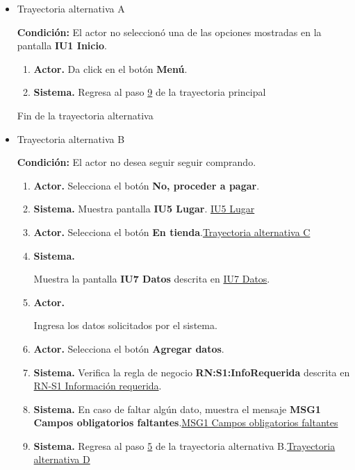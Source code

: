 	\begin{itemize}

		\item \hypertarget{CU1:TAA}{Trayectoria alternativa A}

			\noindent \textbf{Condición:} El actor no seleccionó una de las opciones mostradas en la pantalla \textbf{IU1 Inicio}.
			
			\begin{enumerate}
				\item \textbf{Actor.} Da click en el botón \textbf{Menú}.
				\item \textbf{Sistema.} Regresa al paso \hyperlink{CU1:TP:P9}{9} de la trayectoria principal
			\end{enumerate}
			
			Fin de la trayectoria alternativa
			
		\item \hypertarget{CU1:TAB}{Trayectoria alternativa B}
			
			\noindent \textbf{Condición:} El actor no desea seguir seguir comprando.
			
			\begin{enumerate}
				\item \textbf{Actor.} Selecciona el botón \textbf{No, proceder a pagar}. 
				\item \textbf{Sistema.} Muestra pantalla \textbf{IU5 Lugar}. \hyperlink{IU5}{IU5 Lugar}
				\item \textbf{Actor.} Selecciona el botón \textbf{En tienda}.\hyperlink{CU1:TAC}{Trayectoria alternativa C}
				\item \hypertarget{CU1:TAB:P4} {\textbf{Sistema.}} Muestra la pantalla \textbf{IU7 Datos} descrita en \hyperlink{IU7}{IU7 Datos}.
				\item \hypertarget{CU1:TAB:P5}{\textbf{Actor.}} Ingresa los datos solicitados por el sistema.
				\item \textbf{Actor.} Selecciona el botón \textbf{Agregar datos}.
				\item \textbf{Sistema.} Verifica la regla de negocio \textbf{RN:S1:InfoRequerida} descrita en \hyperlink{RN:S1:InfoRequerida}{RN-S1 Información requerida}.
				\item \textbf{Sistema.} En caso de faltar algún dato, muestra el mensaje \textbf{MSG1 Campos obligatorios faltantes}.\hyperlink{MSG1:CamposObligatorios}{MSG1 Campos obligatorios faltantes}
				\item \textbf{Sistema.} Regresa al paso \hyperlink{CU1:TAB:P5}{5} de la trayectoria alternativa B.\hyperlink{CU1:TAD}{Trayectoria alternativa D} 
				

\end{enumerate}
\end{itemize}
